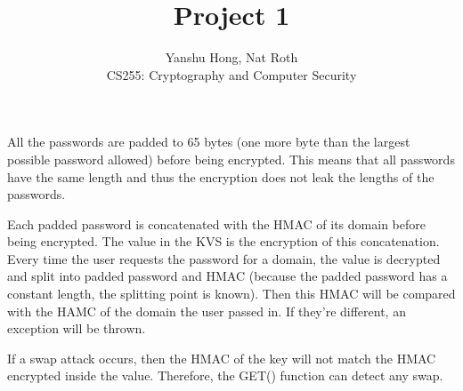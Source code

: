 \documentclass[12pt]{article}
\newenvironment{question}[2][Question]{\begin{trivlist}
\item[\hskip \labelsep {\bfseries #1}\hskip \labelsep {\bfseries #2.}]}{\end{trivlist}}
\begin{document}
\title{Project 1}
\author{Yanshu Hong, Nat Roth\\ 
CS255: Cryptography and Computer Security} 

\maketitle 
 

\begin{question}{1}
All the passwords are padded to 65 bytes (one more byte than the largest possible password allowed) before being encrypted. This means that all passwords have the same length and thus the encryption does not leak the lengths of the passwords.

\end{question}



\begin{question}{2}
Each padded password is concatenated with the HMAC of its domain before being encrypted. The value in the KVS is the encryption of this concatenation. Every time the user requests the password for a domain, the value is decrypted and split into padded password and HMAC (because the padded password has a constant length, the splitting point is known). Then this HMAC will be compared with the HAMC of the domain the user passed in. If they're different, an exception will be thrown.

If a swap attack occurs, then the HMAC of the key will not match the HMAC encrypted inside the value. Therefore, the GET() function can detect any swap.  

\end{question}
\end{document}
